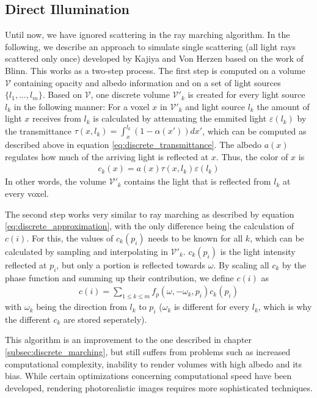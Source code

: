 \subsection{Direct Illumination}\label{subsec:direct_illumination}
Until now, we have ignored scattering in the ray marching algorithm. In the following, we describe an approach to simulate single scattering (all light rays scattered only once) developed by Kajiya and Von Herzen\cite{10.1145/964965.808594} based on the work of Blinn\cite{10.1145/965145.801255}.
This works as a two-step process.
The first step is computed on a volume $\mathcal{V}$ containing opacity and albedo information and on a set of light sources $\{l_1, \ldots, l_m\}$.
Based on $\mathcal{V}$, one discrete volume $\mathcal{V}'_k$ is created for every light source $l_k$ in the following manner:
For a voxel ${x}$ in $\mathcal{V}'_k$ and light source $l_k$ the amount of light ${x}$ receives from $l_k$ is calculated by attenuating the emmited light $\varepsilon(l_k)$ by the transmittance $\tau({x}, l_k) = \int_{{x}}^{l_k}(1 - \alpha({x'}))d{x'}$, which can be computed as described above in equation \ref{eq:discrete_transmittance}.
 The albedo $a({x})$ regulates how much of the arriving light is reflected at ${x}$. Thus, the color of ${x}$ is
\begin{align*}
c_k({x}) = a({x}) \tau({x}, l_k) \varepsilon(l_k)
\end{align*}
In other words, the volume $\mathcal{V}'_k$ contains the light that is reflected from $l_k$ at every voxel.

The second step works very similar to ray marching as described by equation \ref{eq:discrete_approximation}, with the only difference being the calculation of $c(i)$. For this, the values of $c_k(p_i)$ needs to be known for all $k$, which can be calculated by sampling and interpolating in $\mathcal{V}'_k$.
$c_k(p_i)$ is the light intensity reflected at $p_i$, but only a portion is reflected towards $\omega$. By scaling all $c_k$ by the phase function and summing up their contribution, we define $c(i)$ as
\begin{align*}
c(i) = \sum_{1 \le k \le m} f_p(\omega, -\omega_k, p_i)c_k(p_i)
\end{align*}
with $\omega_k$ being the direction from $l_k$ to $p_i$ ($\omega_k$ is different for every $l_k$, which is why the different $c_k$ are stored seperately).


This algorithm is an improvement to the one described in chapter \ref{subsec:discrete_marching}, but still suffers from problems such as increased computational complexity, inability to render volumes with high albedo \cite{10.1145/964965.808594} and its bias\cite{10.1145/3451256}. While certain optimizations concerning computational speed have been developed\cite{10.1145/78964.78965, 10.1145/147130.147155}, rendering photorealistic images requires more sophisticated techniques.










